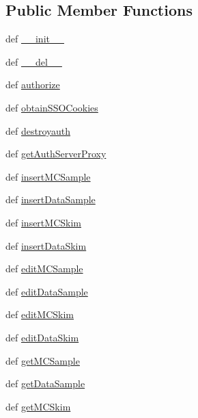 \subsection*{Public Member Functions}
\begin{DoxyCompactItemize}
\item 
def \hyperlink{classaix3adb_1_1aix3adbAuth_a903145e533d7075ca0ee081f3b64171f}{\-\_\-\-\_\-init\-\_\-\-\_\-}
\item 
def \hyperlink{classaix3adb_1_1aix3adbAuth_a0e521e9a4749775d1c958bbd7bcd8d9e}{\-\_\-\-\_\-del\-\_\-\-\_\-}
\item 
def \hyperlink{classaix3adb_1_1aix3adb_a78b79f4bb2138afce2ccef65adac358f}{authorize}
\item 
def \hyperlink{classaix3adb_1_1aix3adb_a5d93931fe3e11b53feb9b12df833571b}{obtain\-S\-S\-O\-Cookies}
\item 
def \hyperlink{classaix3adb_1_1aix3adb_aae76dad69f16fff491ae611a49ca1231}{destroyauth}
\item 
def \hyperlink{classaix3adb_1_1aix3adb_a0613801eeb9a5fab015c4caed6930c89}{get\-Auth\-Server\-Proxy}
\item 
def \hyperlink{classaix3adb_1_1aix3adb_a335e5de44e8ccf14c43d4481e4144849}{insert\-M\-C\-Sample}
\item 
def \hyperlink{classaix3adb_1_1aix3adb_a8d28c54218a849b02d5a7984179fcccc}{insert\-Data\-Sample}
\item 
def \hyperlink{classaix3adb_1_1aix3adb_ab44b8530050a9bd8fedc66ce71480950}{insert\-M\-C\-Skim}
\item 
def \hyperlink{classaix3adb_1_1aix3adb_a1824ce4dcfec133e918e6ba39bdbf64e}{insert\-Data\-Skim}
\item 
def \hyperlink{classaix3adb_1_1aix3adb_a253ab495a681e492f84d679c58a96d20}{edit\-M\-C\-Sample}
\item 
def \hyperlink{classaix3adb_1_1aix3adb_a8f647f62d74927f96bb643f3017709b2}{edit\-Data\-Sample}
\item 
def \hyperlink{classaix3adb_1_1aix3adb_a5d7aa48120141cdd510045ebfd0800d1}{edit\-M\-C\-Skim}
\item 
def \hyperlink{classaix3adb_1_1aix3adb_af49b1bfadd0f576416a5b0b61cd2a8de}{edit\-Data\-Skim}
\item 
def \hyperlink{classaix3adb_1_1aix3adb_a100c375904f1060c782b3be8110a6224}{get\-M\-C\-Sample}
\item 
def \hyperlink{classaix3adb_1_1aix3adb_a536346c13734d319eff83ca3e330925a}{get\-Data\-Sample}
\item 
def \hyperlink{classaix3adb_1_1aix3adb_af1a427cb984a9562cb75f25c1699e0b1}{get\-M\-C\-Skim}

\end{DoxyCompactItemize}
